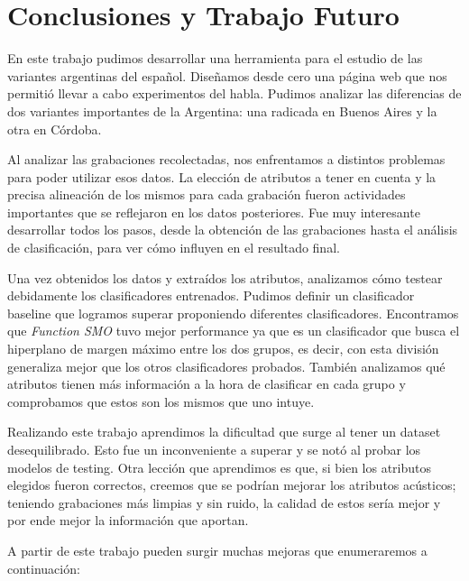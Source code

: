 \chapter{Conclusiones y Trabajo Futuro}

En este trabajo pudimos desarrollar una herramienta para el estudio de las variantes argentinas del español. Diseñamos desde cero una página web que nos permitió llevar a cabo experimentos del habla. Pudimos analizar las diferencias de dos variantes importantes de la Argentina: una radicada en Buenos Aires y la otra en Córdoba. 

Al analizar las grabaciones recolectadas, nos enfrentamos a distintos problemas para poder utilizar esos datos. La elección de atributos a tener en cuenta y la precisa alineación de los mismos para cada grabación fueron actividades importantes que se reflejaron en los datos posteriores. Fue muy interesante desarrollar todos los pasos, desde la obtención de las grabaciones hasta el análisis de clasificación, para ver cómo influyen en el resultado final.

Una vez obtenidos los datos y extraídos los atributos, analizamos cómo testear debidamente los clasificadores entrenados. Pudimos definir un clasificador baseline que logramos superar proponiendo diferentes clasificadores. Encontramos que \textit{Function SMO} tuvo mejor performance ya que es un clasificador que busca el hiperplano de margen máximo entre los dos grupos, es decir, con esta división generaliza mejor que los otros clasificadores probados. También analizamos qué atributos tienen más información a la hora de clasificar en cada grupo y comprobamos que estos son los mismos que uno intuye.

Realizando este trabajo aprendimos la dificultad que surge al tener un dataset desequilibrado. Esto fue un inconveniente a superar y se notó al probar los modelos de testing. Otra lección que aprendimos es que, si bien los atributos elegidos fueron correctos, creemos que se podrían mejorar los atributos acústicos; teniendo grabaciones más limpias y sin ruido, la calidad de estos sería mejor y por ende mejor la información que aportan. 

A partir de este trabajo pueden surgir muchas mejoras que enumeraremos a continuación:

